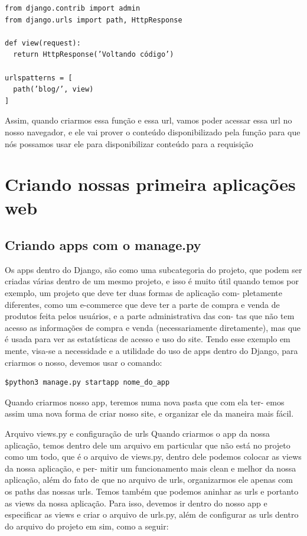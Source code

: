 \documentclass[12pt, a4paper]{paper}
\begin{document}
\begin{verbatim}
from django.contrib import admin
from django.urls import path, HttpResponse

def view(request):
  return HttpResponse(’Voltando código’)

urlspatterns = [
  path(’blog/’, view)
]
\end{verbatim}

Assim, quando criarmos essa função e essa url, vamos poder acessar essa
url no nosso navegador, e ele vai prover o conteúdo disponibilizado pela
função para que nós possamos usar ele para disponibilizar conteúdo para a
requisição

\newpage
\section{Criando nossas primeira aplicações web}%
\label{sec:Criando nossas primeira aplicações web}

\subsection{Criando apps com o manage.py} %
\label{sub:Criando apps com o manage.py}
Os apps dentro do Django, são como uma subcategoria do projeto, que podem
ser criadas várias dentro de um mesmo projeto, e isso é muito útil quando
temos por exemplo, um projeto que deve ter duas formas de aplicação com-
pletamente diferentes, como um e-commerce que deve ter a parte de compra
e venda de produtos feita pelos usuários, e a parte administrativa das con-
tas que não tem acesso as informações de compra e venda (necessariamente
diretamente), mas que é usada para ver as estatísticas de acesso e uso do site.
Tendo esse exemplo em mente, visa-se a necessidade e a utilidade do uso
de apps dentro do Django, para criarmos o nosso, devemos usar o comando:

\begin{verbatim}
$python3 manage.py startapp nome_do_app
\end{verbatim}

Quando criarmos nosso app, teremos numa nova pasta que com ela ter-
emos assim uma nova forma de criar nosso site, e organizar ele da maneira
mais fácil.

Arquivo views.py e configuração de urls
Quando criarmos o app da nossa aplicação, temos dentro dele um arquivo
em particular que não está no projeto como um todo, que é o arquivo de
views.py, dentro dele podemos colocar as views da nossa aplicação, e per-
mitir um funcionamento mais clean e melhor da nossa aplicação, além do
fato de que no arquivo de urls, organizarmos ele apenas com os paths das
nossas urls.
Temos também que podemos aninhar as urls e portanto as views da nossa
aplicação. Para isso, devemos ir dentro do nosso app e especificar as views
e criar o arquivo de urls.py, além de configurar as urls dentro do arquivo
do projeto em sim, como a seguir:
\end{document}
